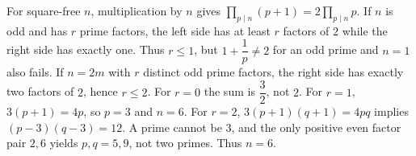 For square-free $n$, multiplication by $n$ gives $\prod_{p\mid n}(p+1)=2\prod_{p\mid n}p$. If $n$ is odd and has $r$ prime factors, the left side has at least $r$ factors of $2$ while the right side has exactly one. Thus $r\le1$, but $1 + \dfrac{1}{p} \ne 2$ for an odd prime and $n=1$ also fails. If $n=2m$ with $r$ distinct odd prime factors, the right side has exactly two factors of $2$, hence $r\le2$. For $r=0$ the sum is $\dfrac{3}{2}$, not $2$. For $r=1$, $3(p+1)=4p$, so $p=3$ and $n=6$. For $r=2$, $3(p+1)(q+1)=4pq$ implies $(p-3)(q-3)=12$. A prime cannot be $3$, and the only positive even factor pair $2,6$ yields $p,q=5,9$, not two primes. Thus $\boxed{n=6}$.
